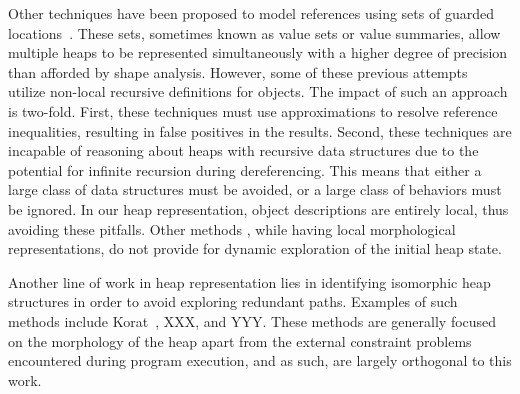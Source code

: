 Other techniques have been proposed to model
references using sets of guarded
locations~\cite{Xie:2005,Cherem:2007,Dillig:2011,Sen:2014}. These sets,
sometimes known as value sets or value summaries, allow multiple heaps
to be represented simultaneously with a higher degree of precision
than afforded by shape analysis. However, some of these previous
attempts~\cite{Xie:2005,Cherem:2007} utilize non-local recursive
definitions for objects. The impact of such an approach is two-fold. 
First, these techniques must use approximations
to resolve reference inequalities, resulting in false positives in the
results. Second, these techniques are incapable of reasoning about
heaps with recursive data structures due to the potential for infinite
recursion during dereferencing. This means that either a large class
of data structures must be avoided, or a large class of behaviors must
be ignored. In our heap representation, object descriptions are
entirely local, thus avoiding these pitfalls. Other methods
\cite{Dillig:2011,Sen:2014}, while having local morphological
representations, do not provide for dynamic exploration of the initial
heap state.

Another line of work in heap representation lies in identifying
isomorphic heap structures in order to avoid exploring redundant
paths. Examples of such methods include Korat~\cite{Milicevic:2007},
XXX, and YYY. These
methods are generally focused on the morphology of the heap apart
from the external constraint problems encountered during
program execution, and as such, are largely orthogonal to this work.
